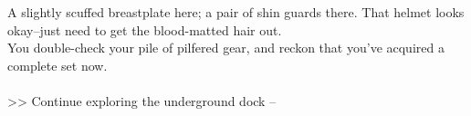 A slightly scuffed breastplate here; a pair of shin guards there. That helmet looks okay--just need to get the blood-matted hair out.\\

You double-check your pile of pilfered gear, and reckon that you’ve acquired a complete set now.\\
\\

>> Continue exploring the underground dock -- 